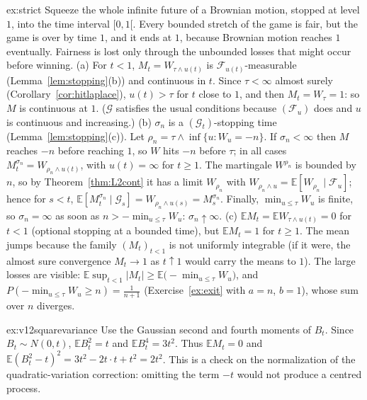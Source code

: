 \begin{solution}{ex:strict}
\idea Squeeze the whole infinite future of a Brownian motion, stopped at level $1$, into the time interval $[0,1[$. Every bounded stretch of the game is fair, but the game is over by time $1$, and it ends
at $1$, because Brownian motion reaches $1$ eventually. Fairness is lost only through the unbounded losses that might occur before winning.
\writeup (a) For $t<1$, $M_t=W_{\tau\wedge u(t)}$ is $\mathcal F_{u(t)}$-measurable (Lemma~\ref{lem:stopping}(b)) and continuous in $t$. Since $\tau<\infty$ almost surely (Corollary~\ref{cor:hitlaplace}), $u(t)>\tau$ for $t$ close
to $1$, and then $M_t=W_\tau=1$: so $M$ is continuous at $1$. ($\mathcal G$ satisfies the usual conditions because $(\mathcal F_u)$ does and $u$ is continuous and increasing.)
(b) $\sigma_n$ is a $(\mathcal G_t)$-stopping time (Lemma~\ref{lem:stopping}(c)). Let $\rho_n=\tau\wedge\inf\{u:W_u=-n\}$. If $\sigma_n<\infty$ then $M$ reaches $-n$ before reaching $1$, so $W$ hits $-n$ before $\tau$; in
all cases $M^{\sigma_n}_t=W_{\rho_n\wedge u(t)}$, with $u(t)=\infty$ for $t\ge1$. The martingale $W^{\rho_n}$ is bounded by $n$, so by Theorem~\ref{thm:L2cont} it has a limit $W_{\rho_n}$ with
$W_{\rho_n\wedge u}=\mathbb E[W_{\rho_n}\mid\mathcal F_u]$; hence for $s<t$, $\mathbb E[M^{\sigma_n}_t\mid\mathcal G_s]=W_{\rho_n\wedge u(s)}=M^{\sigma_n}_s$. Finally, $\min_{u\le\tau}W_u$ is finite, so $\sigma_n=\infty$ as soon as
$n>-\min_{u\le\tau}W_u$: $\sigma_n\uparrow\infty$.
(c) $\mathbb EM_t=\mathbb EW_{\tau\wedge u(t)}=0$ for $t<1$ (optional stopping at a bounded time), but $\mathbb EM_t=1$ for $t\ge1$. The mean jumps because the family $(M_t)_{t<1}$ is not uniformly integrable
(if it were, the almost sure convergence $M_t\to1$ as $t\uparrow1$ would carry the means to $1$). The large losses are visible: $\mathbb E\sup_{t<1}|M_t|\ge\mathbb E\bigl(-\min_{u\le\tau}W_u\bigr)$, and $P(-\min_{u\le\tau}W_u\ge n)=\frac1{n+1}$ (Exercise~\ref{ex:exit} with $a=n$, $b=1$), whose sum over $n$ diverges.
\end{solution}

\begin{solution}{ex:v12squarevariance}
\idea Use the Gaussian second and fourth moments of $B_t$.
\writeup Since $B_t\sim N(0,t)$, $\mathbb EB_t^2=t$ and $\mathbb EB_t^4=3t^2$. Thus $\mathbb EM_t=0$ and $\mathbb E(B_t^2-t)^2=3t^2-2t\cdot t+t^2=2t^2$. This is a check on the normalization of the quadratic-variation correction: omitting the term $-t$ would not produce a centred process.
\end{solution}

